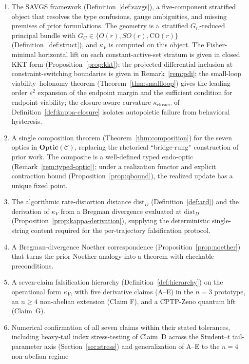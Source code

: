 \documentclass[11pt,a4paper]{article}
\theoremstyle{plain}
\theoremstyle{definition}
\theoremstyle{remark}
\newcommand{\kk}{\kappa_{\!V}}
\newcommand{\CC}{\mathcal{C}}
\newcommand{\CO}{\mathrm{CO}}
\newcommand{\Optic}{\mathbf{Optic}}
\newcommand{\distD}{\mathrm{dist}_{D}}
\begin{document}
\begin{enumerate}[leftmargin=*,itemsep=2pt]
\item The SAVGS framework (Definition~\ref{def:savgs}), a
five-component stratified object that resolves the type confusions,
gauge ambiguities, and missing premises of prior formulations. The
geometry is a stratified $G_C$-reduced principal bundle with $G_C \in \{O(r), SO(r), \CO(r)\}$ (Definition~\ref{def:struct}), and $\kk$ is
computed on this object. The Fisher-minimal horizontal lift on each
constant-active-set stratum is given in closed KKT form
(Proposition~\ref{prop:kkt}); the projected differential inclusion at
constraint-switching boundaries is given in Remark~\ref{rem:pdi}; the
small-loop viability--holonomy theorem
(Theorem~\ref{thm:smallloop}) gives the leading-order $\varepsilon^2$
expansion of the endpoint margin and the sufficient condition for
endpoint viability; the closure-aware curvature
$\kappa_{\mathrm{closure}}$ of Definition~\ref{def:kappa-closure}
isolates autopoietic failure from behavioral hysteresis.
\item A single composition theorem (Theorem~\ref{thm:composition}) for
the seven optics in $\Optic(\CC)$, replacing the rhetorical
``bridge-rung'' construction of prior work. The composite is a
well-defined typed endo-optic (Remark~\ref{rem:typed-optic}); under a
realization functor and explicit contraction bound
(Proposition~\ref{prop:qbound}), the realized update has a unique
fixed point.
\item The algorithmic rate-distortion distance $\distD$
(Definition~\ref{def:ard}) and the derivation of $\kk$ from a Bregman
divergence evaluated at $\distD$
(Proposition~\ref{prop:kappa-derivation}), supplying the deterministic
single-string content required for the per-trajectory falsification
protocol.
\item A Bregman-divergence Noether correspondence
(Proposition~\ref{prop:noether}) that turns the prior Noether analogy
into a theorem with checkable preconditions.
\item A seven-claim falsification hierarchy
(Definition~\ref{def:hierarchy}) on the operational form $\kk$, with
five derivative claims (A--E) in the $n=3$ prototype, an $n\geq 4$
non-abelian extension (Claim F), and a CPTP-Zeno quantum lift
(Claim~G).
\item Numerical confirmation of all seven claims within their stated
tolerances, including heavy-tail index stress-testing of Claim~D across
the Student--$t$ tail-parameter axis (Section~\ref{sec:stress}) and
generalization of A--E to the $n=4$ non-abelian regime

\end{enumerate}
\end{document}
